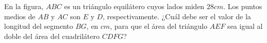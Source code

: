 En la figura, $ABC$ es un triángulo equilátero cuyos lados miden $28 cm$. Los puntos medios de $AB$ y $AC$ son $E$ y $D$, respectivamente. ¿Cuál debe ser el valor de la longitud del segmento $BG$, en $cm$, para que el área del triángulo $AEF$ sea igual al doble del área del cuadrilátero $CDFG$?